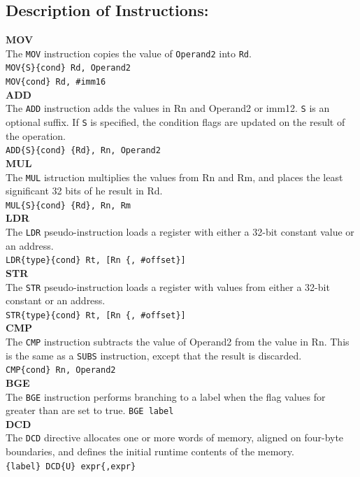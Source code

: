\documentclass[12pt]{article}
\begin{document}
\subsection{Description of Instructions:}
\textbf{MOV}\\
The \verb|MOV| instruction copies the value of \verb|Operand2| into \verb|Rd|.\\
\verb|MOV{S}{cond} Rd, Operand2|\\
\verb|MOV{cond} Rd, #imm16|\\
\textbf{ADD}\\
The \verb|ADD| instruction adds the values in Rn and Operand2 or imm12. \verb|S| is an optional suffix. If \verb|S| is specified, the condition flags are updated on the result of the operation.\\
\verb|ADD{S}{cond} {Rd}, Rn, Operand2|\\
\textbf{MUL}\\
The \verb|MUL| istruction multiplies the values from Rn and Rm, and places the least significant 32 bits of he result in Rd.\\
\verb |MUL{S}{cond} {Rd}, Rn, Rm|\\
\textbf{LDR}\\
The \verb|LDR| pseudo-instruction loads a register with either a 32-bit constant value or an address.\\
\verb|LDR{type}{cond} Rt, [Rn {, #offset}]| \\
\textbf{STR}\\
The \verb|STR| pseudo-instruction loads a register with values from either a 32-bit constant or an address.\\
\verb|STR{type}{cond} Rt, [Rn {, #offset}]|\\  
\textbf{CMP}\\
The \verb|CMP| instruction subtracts the value of Operand2 from the value in Rn. This is the same as a \verb|SUBS| instruction, except that the result is discarded.\\
\verb|CMP{cond} Rn, Operand2|\\
\textbf{BGE}\\
The \verb|BGE| instruction performs branching to a label when the flag values for greater than are set to true.
\verb|BGE label|\\
\textbf{DCD}\\
The \verb|DCD| directive allocates one or more words of memory, aligned on four-byte boundaries, and defines the initial runtime contents of the memory.\\
\verb|{label} DCD{U} expr{,expr}|\\
\pagebreak
\end{document}
